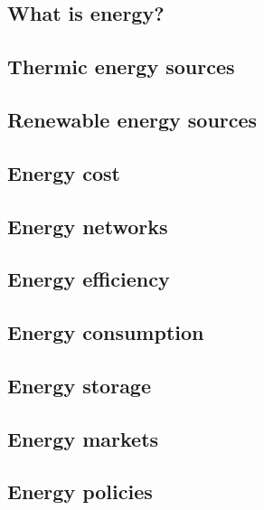 \documentclass[../summary.tex]{subfiles}
\begin{document}
	\subsection{What is energy?}
	\subsection{Thermic energy sources}
	\subsection{Renewable energy sources}
	\subsection{Energy cost}
	\subsection{Energy networks}
	\subsection{Energy efficiency}
	\subsection{Energy consumption}
	\subsection{Energy storage}
	\subsection{Energy markets}
	\subsection{Energy policies}
	
\end{document}
